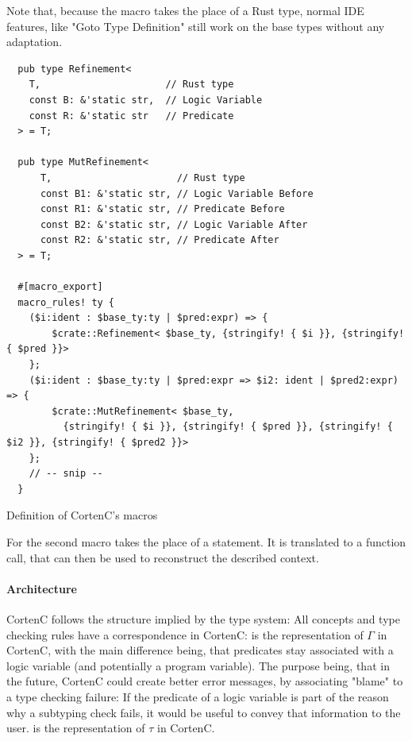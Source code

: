 \documentclass[twoside, english]{sdqthesis}
\theoremstyle{definition}
\begin{document}
Note that, because the  macro takes the place of a Rust type, normal IDE features, like "Goto Type Definition" still work on the base types without any adaptation.

\begin{listing}[ht]
  \begin{verbatim}
  pub type Refinement<
    T,                      // Rust type
    const B: &'static str,  // Logic Variable
    const R: &'static str   // Predicate
  > = T;

  pub type MutRefinement<
      T,                      // Rust type
      const B1: &'static str, // Logic Variable Before
      const R1: &'static str, // Predicate Before
      const B2: &'static str, // Logic Variable After
      const R2: &'static str, // Predicate After
  > = T;

  #[macro_export]
  macro_rules! ty {
    ($i:ident : $base_ty:ty | $pred:expr) => {
        $crate::Refinement< $base_ty, {stringify! { $i }}, {stringify! { $pred }}>
    };
    ($i:ident : $base_ty:ty | $pred:expr => $i2: ident | $pred2:expr) => {
        $crate::MutRefinement< $base_ty, 
          {stringify! { $i }}, {stringify! { $pred }}, {stringify! { $i2 }}, {stringify! { $pred2 }}>
    };
    // -- snip --
  }
  \end{verbatim}
  \caption{Definition of CortenC's macros}
  \label{lst:macro-definition}
\end{listing}

For the second macro  takes the place of a statement. 
It is translated to a function call, that can then be used to reconstruct the described context.

\paragraph{Architecture}
CortenC follows the structure implied by the type system: All concepts and type checking rules have a correspondence in CortenC:
 is the representation of $\Gamma$ in CortenC, with the main difference being, that predicates stay associated with a logic variable (and potentially a program variable). The purpose being, that in the future, CortenC could create better error messages, by associating "blame" to a type checking failure: If the predicate of a logic variable is part of the reason why a subtyping check fails, it would be useful to convey that information to the user. 
 is the representation of $\tau$ in CortenC.
\end{document}
